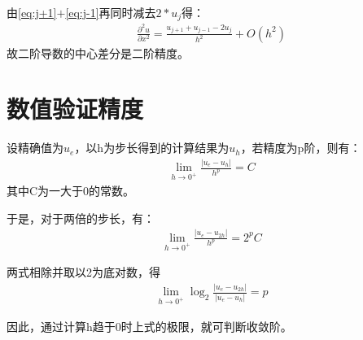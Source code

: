 \documentclass[12pt, a4paper]{article}
\begin{document}
由\eqref{eq:j+1}$+$\eqref{eq:j-1}再同时减去$2*u_j$得：
\begin{align}
    \frac{\partial^2{u}}{\partial{x}^2} = \frac{u_{j+1}+u_{j-1}-2u_j}{h^2} + O(h^2)
\end{align}
故二阶导数的中心差分是二阶精度。

\section{数值验证精度}
设精确值为$u_e$，以h为步长得到的计算结果为$u_h$，若精度为p阶，则有：
\begin{align}
    \lim_{h \to 0^+}\frac{\vert{u_e-u_h}\vert}{h^p} = C 
\end{align}
其中C为一大于0的常数。

于是，对于两倍的步长，有：
\begin{align}
    \lim_{h \to 0^+}\frac{\vert{u_e-u_{2h}\vert}}{h^p} = 2^pC
\end{align}

两式相除并取以2为底对数，得
\begin{align}
    \lim_{h \to 0^+}\log_2\frac{\vert{u_e-u_{2h}\vert}}{\vert{u_e-u_h}\vert} = p
\end{align}

因此，通过计算h趋于0时上式的极限，就可判断收敛阶。
\end{document}
